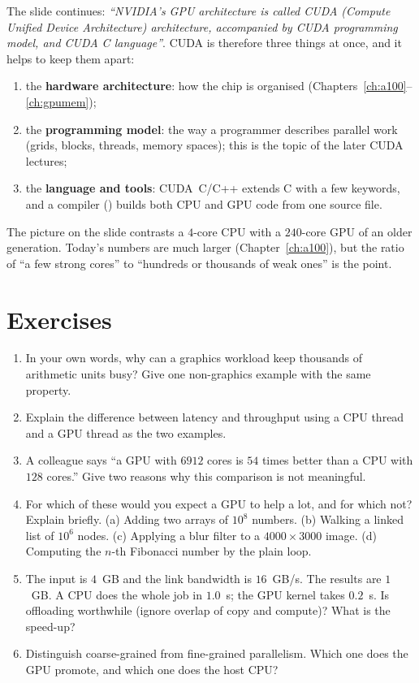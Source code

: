 The slide continues: \emph{``NVIDIA's GPU architecture is called CUDA (Compute Unified Device Architecture)
architecture, accompanied by CUDA programming model, and CUDA C language''}. CUDA is therefore three things at once,
and it helps to keep them apart:
\begin{enumerate}
  \item the \textbf{hardware architecture}: how the chip is organised (Chapters~\ref{ch:a100}--\ref{ch:gpumem});
  \item the \textbf{programming model}: the way a programmer describes parallel work (grids, blocks, threads, memory spaces); this is the topic of the later CUDA lectures;
  \item the \textbf{language and tools}: CUDA~C/C++ extends C with a few keywords, and a compiler () builds both CPU and GPU code from one source file.
\end{enumerate}
The picture on the slide contrasts a $4$-core CPU with a $240$-core GPU of an older generation. Today's numbers are much larger
(Chapter~\ref{ch:a100}), but the ratio of ``a few strong cores'' to ``hundreds or thousands of weak ones'' is the point.

\section*{Exercises}
\begin{enumerate}[label=\textbf{\thechapter.\arabic*},leftmargin=*]
  \item In your own words, why can a graphics workload keep thousands of arithmetic units busy? Give one non-graphics example with the same property.
  \item Explain the difference between latency and throughput using a CPU thread and a GPU thread as the two examples.
  \item A colleague says ``a GPU with $6912$ cores is $54$ times better than a CPU with $128$ cores.'' Give two reasons why this comparison is not meaningful.
  \item For which of these would you expect a GPU to help a lot, and for which not? Explain briefly. (a) Adding two arrays of $10^{8}$ numbers. (b) Walking a linked list of $10^{6}$ nodes. (c) Applying a blur filter to a $4000\times3000$ image. (d) Computing the $n$-th Fibonacci number by the plain loop.
  \item The input is $4$~GB and the link bandwidth is $16$~GB/s. The results are $1$~GB. A CPU does the whole job in $1.0$~s; the GPU kernel takes $0.2$~s. Is offloading worthwhile (ignore overlap of copy and compute)? What is the speed-up?
  \item Distinguish coarse-grained from fine-grained parallelism. Which one does the GPU promote, and which one does the host CPU?
\end{enumerate}
